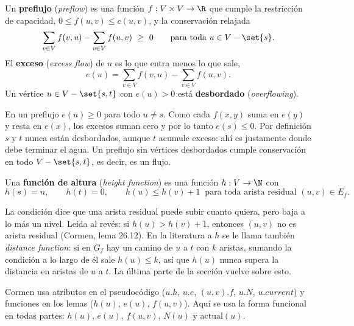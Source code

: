 \documentclass[11pt,letterpaper]{article}
\begin{document}
\begin{definicion}[Preflujo]
  \label{def:preflujo}
  Un \textbf{preflujo} (\textit{preflow}) es una función
  $f : V \times V \to \R$ que cumple la restricción de capacidad,
  $0 \le f(u, v) \le c(u, v)$, y la conservación relajada
  \[
    \sum_{v \in V} f(v, u) - \sum_{v \in V} f(u, v) \ \ge\ 0
    \qquad \text{para toda } u \in V - \set{s} .
  \]
  El \textbf{exceso} (\textit{excess flow}) de $u$ es lo que entra
  menos lo que sale,
  \[
    e(u) = \sum_{v \in V} f(v, u) - \sum_{v \in V} f(u, v) .
  \]
  Un vértice $u \in V - \set{s, t}$ con $e(u) > 0$ está
  \textbf{desbordado} (\textit{overflowing}).
\end{definicion}

En un preflujo $e(u) \ge 0$ para todo $u \neq s$. Como cada $f(x, y)$
suma en $e(y)$ y resta en $e(x)$, los excesos suman cero y por lo tanto
$e(s) \le 0$. Por definición $s$ y $t$ nunca están desbordados, aunque
$t$ acumule exceso: ahí es justamente donde debe terminar el agua. Un
preflujo sin vértices desbordados cumple conservación en todo
$V - \set{s, t}$, es decir, es un flujo.

\begin{definicion}
  \label{def:altura-push}
  Una \textbf{función de altura} (\textit{height function}) es una
  función $h : V \to \N$ con
  \[
    h(s) = n , \qquad h(t) = 0 , \qquad
    h(u) \le h(v) + 1 \ \text{ para toda arista residual }
    (u, v) \in E_f .
  \]
\end{definicion}

La condición dice que una arista residual puede subir cuanto quiera,
pero baja a lo más un nivel. Leída al revés: si $h(u) > h(v) + 1$,
entonces $(u, v)$ no es arista residual (Cormen, lema 26.12). En la
literatura a $h$ se le llama también \textit{distance function}: si en
$G_f$ hay un camino de $u$ a $t$ con $k$ aristas, sumando la condición
a lo largo de él sale $h(u) \le k$, así que $h(u)$ nunca supera la
distancia en aristas de $u$ a $t$. La última parte de la sección
vuelve sobre esto.

\begin{observacion}
  Cormen usa atributos en el pseudocódigo ($u.h$, $u.e$, $(u, v).f$,
  $u.N$, $u.\mathit{current}$) y funciones en los lemas ($h(u)$,
  $e(u)$, $f(u, v)$). Aquí se usa la forma funcional en todas partes:
  $h(u)$, $e(u)$, $f(u, v)$, $N(u)$ y $\text{actual}(u)$.
\end{observacion}

\end{document}
